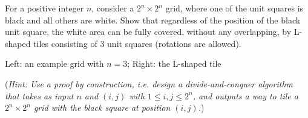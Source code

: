 \documentclass[11pt]{article}
\begin{document}
    \begin{tcolorbox}[title={Problem 3 (Grid Tiling, 35 pts)}]
        For a positive integer $n$, consider a $2^n \times 2^n$ grid, where one of the unit squares is black and all others are white. Show that regardless of the position of the black unit square, the white area can be fully covered, without any overlapping, by L-shaped tiles consisting of $3$ unit squares (rotations are allowed).
        
        \bigskip
        
        {
        \centering
        
        Left: an example grid with $n=3$; Right: the L-shaped tile
        
        }

        \bigskip
        
        (\emph{Hint: Use a proof by construction, i.e. design a divide-and-conquer algorithm that takes as input $n$ and $(i,j)$ with $1\leq i,j \leq 2^n$, and outputs a way to tile a $2^n\times 2^n$ grid with the black square at position $(i,j)$.}) 
        \medskip

             
    \end{tcolorbox}
    
    
\end{document}
